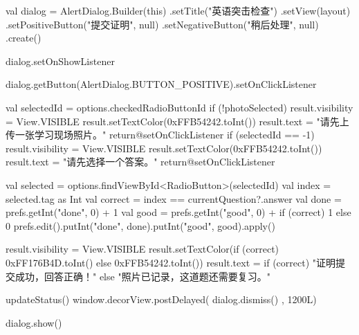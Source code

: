 {{        val dialog = AlertDialog.Builder(this)
            .setTitle("英语突击检查")
            .setView(layout)
            .setPositiveButton("提交证明", null)
            .setNegativeButton("稍后处理", null)
            .create()

        dialog.setOnShowListener {
            dialog.getButton(AlertDialog.BUTTON_POSITIVE).setOnClickListener {
                val selectedId = options.checkedRadioButtonId
                if (!photoSelected) {
                    result.visibility = View.VISIBLE
                    result.setTextColor(0xFFB54242.toInt())
                    result.text = "请先上传一张学习现场照片。"
                    return@setOnClickListener
                }
                if (selectedId == -1) {
                    result.visibility = View.VISIBLE
                    result.setTextColor(0xFFB54242.toInt())
                    result.text = "请先选择一个答案。"
                    return@setOnClickListener
                }

                val selected = options.findViewById<RadioButton>(selectedId)
                val index = selected.tag as Int
                val correct = index == currentQuestion?.answer
                val done = prefs.getInt("done", 0) + 1
                val good = prefs.getInt("good", 0) + if (correct) 1 else 0
                prefs.edit().putInt("done", done).putInt("good", good).apply()

                result.visibility = View.VISIBLE
                result.setTextColor(if (correct) 0xFF176B4D.toInt() else 0xFFB54242.toInt())
                result.text = if (correct) "证明提交成功，回答正确！"
                else "照片已记录，这道题还需要复习。"

                updateStatus()
                window.decorView.postDelayed({ dialog.dismiss() }, 1200L)
            }
        }

        dialog.show()
    }
}
